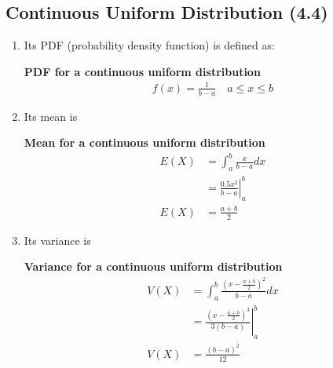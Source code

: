\documentclass[../INDE315.tex]{subfiles}
\begin{document}
\subsection*{Continuous Uniform Distribution (4.4)}
\begin{enumerate}
    \item Its PDF (probability density function) is defined as:
        \begin{defn}
            \textbf{PDF for a continuous uniform distribution} \\
            \begin{equation*}
                \begin{aligned}
                    f(x) = \frac{1}{b-a} \quad a \leq x \leq b
                \end{aligned}
            \end{equation*}
        \end{defn}
    \item Its mean is
        \begin{defn}
            \textbf{Mean for a continuous uniform distribution} \\
            \begin{equation*}
                \begin{aligned}
                    E(X) &= \int ^b _a \frac{x}{b-a} dx \\
                        &= \left. \frac{0.5x^2}{b-a} \right|^b _a \\
                    E(X) &= \frac{a + b}{2}
                \end{aligned}
            \end{equation*}
        \end{defn}
    \item Its variance is
        \begin{defn}
            \textbf{Variance for a continuous uniform distribution} \\
            \begin{equation*}
                \begin{aligned}
                    V(X) &= \int ^b _a \frac{(x - \frac{a+b}{2})^2}{b-a} dx \\
                        &= \left. \frac{(x - \frac{a+b}{2})^3}{3(b-a)} \right|^b _a \\
                    V(X) &= \frac{(b-a)^2}{12}
                \end{aligned}
            \end{equation*}
        \end{defn}

\end{enumerate}
\end{document}
